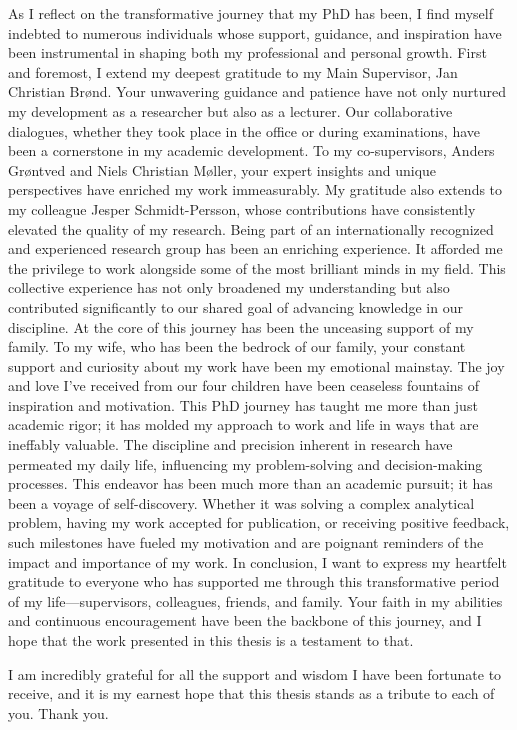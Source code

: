 \documentclass[
  10pt,
]{scrbook}
\begin{document}
As I reflect on the transformative journey that my PhD has been, I find myself indebted to numerous individuals whose support, guidance, and inspiration have been instrumental in shaping both my professional and personal growth.
First and foremost, I extend my deepest gratitude to my Main Supervisor, Jan Christian Brønd. Your unwavering guidance and patience have not only nurtured my development as a researcher but also as a lecturer. Our collaborative dialogues, whether they took place in the office or during examinations, have been a cornerstone in my academic development.
To my co-supervisors, Anders Grøntved and Niels Christian Møller, your expert insights and unique perspectives have enriched my work immeasurably. My gratitude also extends to my colleague Jesper Schmidt-Persson, whose contributions have consistently elevated the quality of my research.
Being part of an internationally recognized and experienced research group has been an enriching experience. It afforded me the privilege to work alongside some of the most brilliant minds in my field. This collective experience has not only broadened my understanding but also contributed significantly to our shared goal of advancing knowledge in our discipline.
At the core of this journey has been the unceasing support of my family. To my wife, who has been the bedrock of our family, your constant support and curiosity about my work have been my emotional mainstay. The joy and love I've received from our four children have been ceaseless fountains of inspiration and motivation.
This PhD journey has taught me more than just academic rigor; it has molded my approach to work and life in ways that are ineffably valuable. The discipline and precision inherent in research have permeated my daily life, influencing my problem-solving and decision-making processes. This endeavor has been much more than an academic pursuit; it has been a voyage of self-discovery.
Whether it was solving a complex analytical problem, having my work accepted for publication, or receiving positive feedback, such milestones have fueled my motivation and are poignant reminders of the impact and importance of my work.
In conclusion, I want to express my heartfelt gratitude to everyone who has supported me through this transformative period of my life—supervisors, colleagues, friends, and family. Your faith in my abilities and continuous encouragement have been the backbone of this journey, and I hope that the work presented in this thesis is a testament to that.

I am incredibly grateful for all the support and wisdom I have been fortunate to receive, and it is my earnest hope that this thesis stands as a tribute to each of you. Thank you.
\end{document}
